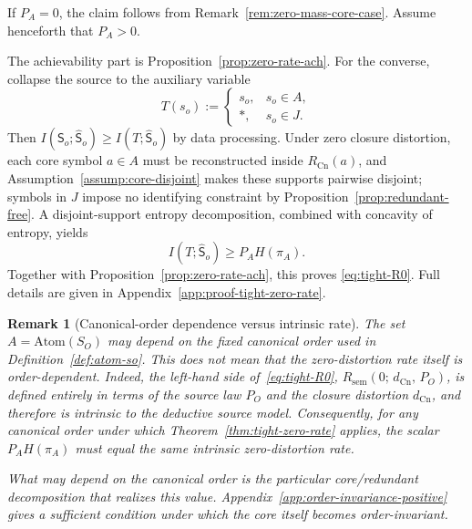 \documentclass[journal,onecolumn]{IEEEtran}
\makeatletter
\newcommand{\Atom}{\text{Atom}}
\newcommand{\Cn}{\text{Cn}}
\newtheorem{remark}{Remark}[section]
\numberwithin{equation}{section}
\renewenvironment{proof}[1][\proofname]{\par
  \pushQED{\qed}%
  \normalfont \topsep6\p@\@plus6\p@\relax
  \trivlist
  \item[\hskip\labelsep
        \itshape
    #1\@addpunct{.}]\ignorespaces
}{%
  \popQED\endtrivlist\@endpefalse
}
\makeatother
\begin{document}
\begin{proof}[Proof sketch]
If \(P_A=0\), the claim follows from
Remark~\ref{rem:zero-mass-core-case}. Assume henceforth that
\(P_A>0\).

The achievability part is Proposition~\ref{prop:zero-rate-ach}.
For the converse, collapse the source to the auxiliary variable
\[
  T(s_o)
  :=
  \begin{cases}
    s_o, & s_o\in A,\\
    *,   & s_o\in J.
  \end{cases}
\]
Then \(I({\mathsf{S}}_o;\hat {\mathsf{S}}_o)\ge I(T;\hat {\mathsf{S}}_o)\) by data processing.
Under zero closure distortion, each core symbol \(a\in A\) must be
reconstructed inside \(R_{\Cn}(a)\), and
Assumption~\ref{assump:core-disjoint} makes these supports pairwise
disjoint; symbols in \(J\) impose no identifying constraint by
Proposition~\ref{prop:redundant-free}. A disjoint-support entropy
decomposition, combined with concavity of entropy, yields
\[
  I(T;\hat {\mathsf{S}}_o)\ge P_A H(\pi_A).
\]
Together with Proposition~\ref{prop:zero-rate-ach}, this proves
\eqref{eq:tight-R0}. Full details are given in
Appendix~\ref{app:proof-tight-zero-rate}.
\end{proof}

\begin{remark}[Canonical-order dependence versus intrinsic rate]
\label{rem:order-vs-rate}
The set \(A=\Atom(S_O)\) may depend on the fixed canonical order used
in Definition~\ref{def:atom-so}. This does \emph{not} mean that the
zero-distortion rate itself is order-dependent.
Indeed, the left-hand side of~\eqref{eq:tight-R0},
\(R_{\mathrm{sem}}(0;\,d_{\Cn},\,P_O)\), is defined entirely in terms
of the source law \(P_O\) and the closure distortion \(d_{\Cn}\), and
therefore is intrinsic to the deductive source model.
Consequently, for any canonical order under which
Theorem~\ref{thm:tight-zero-rate} applies, the scalar
\(P_AH(\pi_A)\) must equal the same intrinsic zero-distortion rate.

What may depend on the canonical order is the particular
core/redundant decomposition that realizes this value.
Appendix~\ref{app:order-invariance-positive} gives a sufficient
condition under which the core itself becomes order-invariant.
\end{remark}
\end{document}
